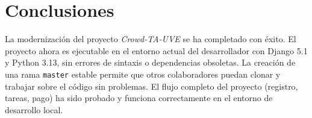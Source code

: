 \documentclass[12pt, spanish]{article}
\begin{document}
\section{Conclusiones}
La modernización del proyecto \textit{Crowd-TA-UVE} se ha completado con éxito. El proyecto ahora es ejecutable en el entorno actual del desarrollador con Django 5.1 y Python 3.13, sin errores de sintaxis o dependencias obsoletas. La creación de una rama \texttt{master} estable permite que otros colaboradores puedan clonar y trabajar sobre el código sin problemas. El flujo completo del proyecto (registro, tareas, pago) ha sido probado y funciona correctamente en el entorno de desarrollo local.
\end{document}
